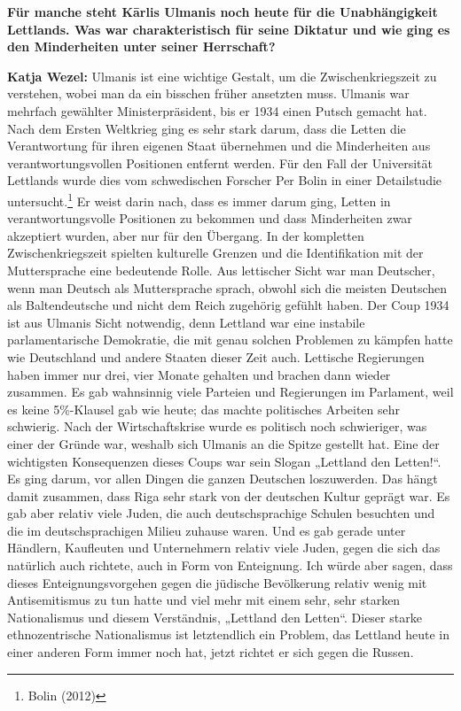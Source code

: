 \textbf{Für manche steht Kārlis Ulmanis noch heute für die Unabhängigkeit Lettlands. Was war charakteristisch für seine Diktatur und wie ging es den Minderheiten unter seiner Herrschaft?} 

\textbf{Katja Wezel:} Ulmanis ist eine wichtige Gestalt, um die Zwischenkriegszeit zu verstehen, wobei man da ein bisschen früher ansetzten muss. Ulmanis war mehrfach gewählter Ministerpräsident, bis er 1934 einen Putsch gemacht hat. Nach dem Ersten Weltkrieg ging es sehr stark darum, dass die Letten die Verantwortung für ihren eigenen Staat übernehmen und die Minderheiten aus verantwortungsvollen Positionen entfernt werden. Für den Fall der Universität Lettlands wurde dies vom schwedischen Forscher Per Bolin in einer Detailstudie untersucht.\footnote{Bolin (2012)} Er weist darin nach, dass es immer darum ging, Letten in verantwortungsvolle Positionen zu bekommen und dass Minderheiten zwar akzeptiert wurden, aber nur für den Übergang. 
In der kompletten Zwischenkriegszeit spielten kulturelle Grenzen und die Identifikation mit der Muttersprache eine bedeutende Rolle. Aus lettischer Sicht war man Deutscher, wenn man Deutsch als Muttersprache sprach, obwohl sich die meisten Deutschen als Baltendeutsche und nicht dem Reich zugehörig gefühlt haben. 
Der Coup 1934 ist aus Ulmanis Sicht notwendig, denn Lettland war eine instabile parlamentarische Demokratie, die mit genau solchen Problemen zu kämpfen hatte wie Deutschland und andere Staaten dieser Zeit auch. Lettische Regierungen haben immer nur drei, vier Monate gehalten und brachen dann wieder zusammen. Es gab wahnsinnig viele Parteien und Regierungen im Parlament, weil es keine 5\%-Klausel gab wie heute; das machte politisches Arbeiten sehr schwierig. Nach der Wirtschaftskrise wurde es politisch noch schwieriger, was einer der Gründe war, weshalb sich Ulmanis an die Spitze gestellt hat. Eine der wichtigsten Konsequenzen dieses Coups war sein Slogan „Lettland den Letten!“. Es ging darum, vor allen Dingen die ganzen Deutschen loszuwerden. Das hängt damit zusammen, dass Riga sehr stark von der deutschen Kultur geprägt war. Es gab aber relativ viele Juden, die auch deutschsprachige Schulen besuchten und die im deutschsprachigen Milieu zuhause waren. Und es gab gerade unter Händlern, Kaufleuten und Unternehmern relativ viele Juden, gegen die sich das natürlich auch richtete, auch in Form von Enteignung. Ich würde aber sagen, dass dieses Enteignungsvorgehen gegen die jüdische Bevölkerung relativ wenig mit Antisemitismus zu tun hatte und viel mehr mit einem sehr, sehr starken Nationalismus und diesem Verständnis, „Lettland den Letten“. Dieser starke ethnozentrische Nationalismus ist letztendlich ein Problem, das Lettland heute in einer anderen Form immer noch hat, jetzt richtet er sich gegen die Russen. 


